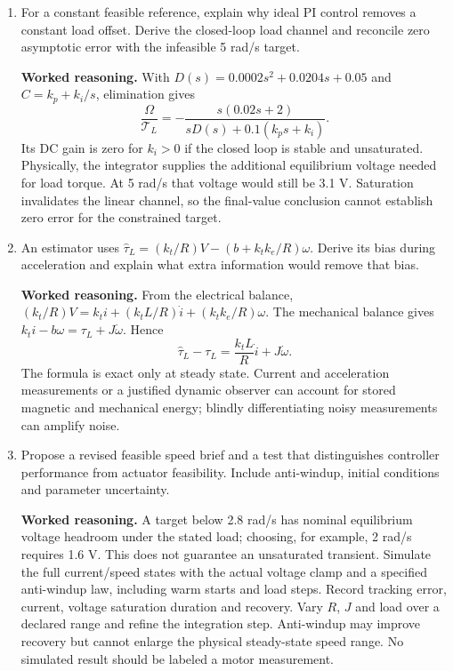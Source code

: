 \documentclass[10pt,a4paper]{article}
\newcommand{\answer}{\par\smallskip\textbf{Worked reasoning.} }
\begin{document}
\begin{enumerate}
\answer The reduced characteristic polynomial is $0.4s^2+(1+2k_p)s+2k_i$. Matching $0.4(s+3)(s+5)=0.4s^2+3.2s+6$ gives $k_p=1.1$ and $k_i=3$. With the full plant the polynomial becomes
\[
0.0002s^3+0.0204s^2+0.16s+0.3.
\]
All coefficients are positive and the cubic Routh inequality is $0.0204(0.16)>0.0002(0.3)$, or $0.003264>0.00006$. Thus the unsaturated full model is stable. Its poles are approximately $-93.6265,-5.41460,-2.95887$ s$^{-1}$, rather than exactly the two reduced design poles, since the additional state remains.
\item For a constant feasible reference, explain why ideal PI control removes a constant load offset. Derive the closed-loop load channel and reconcile zero asymptotic error with the infeasible 5 rad/s target.
\answer With $D(s)=0.0002s^2+0.0204s+0.05$ and $C=k_p+k_i/s$, elimination gives
\[
\frac{\Omega}{\mathcal{T}_L}=-\frac{s(0.02s+2)}{sD(s)+0.1(k_ps+k_i)}.
\]
Its DC gain is zero for $k_i>0$ if the closed loop is stable and unsaturated. Physically, the integrator supplies the additional equilibrium voltage needed for load torque. At 5 rad/s that voltage would still be 3.1 V. Saturation invalidates the linear channel, so the final-value conclusion cannot establish zero error for the constrained target.
\item An estimator uses $\widehat{\tau}_L=(k_t/R)V-(b+k_tk_e/R)\omega$. Derive its bias during acceleration and explain what extra information would remove that bias.
\answer From the electrical balance, $(k_t/R)V=k_t i+(k_tL/R)\dot i+(k_tk_e/R)\omega$. The mechanical balance gives $k_ti-b\omega=\tau_L+J\dot\omega$. Hence
\[
\widehat{\tau}_L-\tau_L=\frac{k_tL}{R}\dot i+J\dot\omega.
\]
The formula is exact only at steady state. Current and acceleration measurements or a justified dynamic observer can account for stored magnetic and mechanical energy; blindly differentiating noisy measurements can amplify noise.
\item Propose a revised feasible speed brief and a test that distinguishes controller performance from actuator feasibility. Include anti-windup, initial conditions and parameter uncertainty.
\answer A target below 2.8 rad/s has nominal equilibrium voltage headroom under the stated load; choosing, for example, 2 rad/s requires 1.6 V. This does not guarantee an unsaturated transient. Simulate the full current/speed states with the actual voltage clamp and a specified anti-windup law, including warm starts and load steps. Record tracking error, current, voltage saturation duration and recovery. Vary $R$, $J$ and load over a declared range and refine the integration step. Anti-windup may improve recovery but cannot enlarge the physical steady-state speed range. No simulated result should be labeled a motor measurement.
\end{enumerate}
\end{document}
